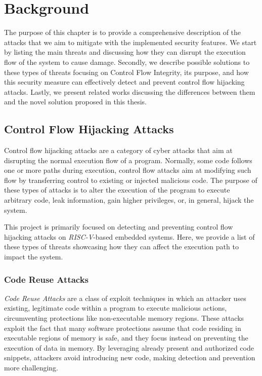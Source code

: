 \chapter{Background}
\label{cha:background}

The purpose of this chapter is to provide a comprehensive description of the
attacks that we aim to mitigate with the implemented security features. We start
by listing the main threats and discussing how they can disrupt the execution flow
of the system to cause damage. Secondly, we describe possible solutions to these
types of threats focusing on Control Flow Integrity, its purpose, and how this security
measure can effectively detect and prevent control flow hijacking attacks.
Lastly, we present related works discussing the differences between them and the
novel solution proposed in this thesis.

\section{Control Flow Hijacking Attacks}
\label{sec:background_cfa}

Control flow hijacking attacks are a category of cyber attacks that aim at
disrupting the normal execution flow of a program. Normally, some code follows
one or more paths during execution, control flow attacks aim at modifying such flow
by transferring control to existing or injected malicious code. The purpose of
these types of attacks is to alter the execution of the program to execute
arbitrary code, leak information, gain higher privileges, or, in general, hijack
the system.

This project is primarily focused on detecting and preventing control flow hijacking
attacks on \textit{RISC-V}-based embedded systems. Here, we provide a list of
these types of threats showcasing how they can affect the execution path to
impact the system.

\subsection{Code Reuse Attacks}
\label{subsec:background_codereuse}

\textit{Code Reuse Attacks} are a class of exploit techniques in which an
attacker uses existing, legitimate code within a program to execute malicious actions,
circumventing protections like non-executable memory regions. These attacks exploit
the fact that many software protections assume that code residing in executable regions
of memory is safe, and they focus instead on preventing the execution of data in
memory. By leveraging already present and authorized code snippets, attackers
avoid introducing new code, making detection and prevention more challenging.

